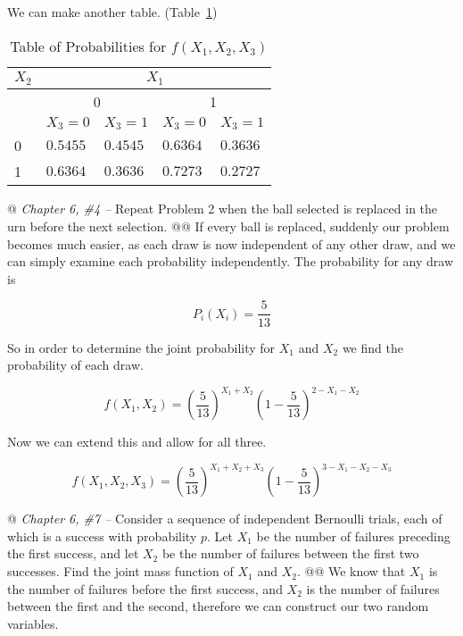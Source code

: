 \documentclass[11pt]{article}\usepackage[]{graphicx}\usepackage[]{xcolor}
\begin{document}
\begin{easylist}[enumerate]
    We can make another table. (Table~\ref{table:probs.b})

    \begin{table}
        \centering
        \begin{tabular}{|l|l|l|l|l|}
            \hline
            $X_2$ & \multicolumn{4}{|c|}{$X_1$}\\
            \hline
            & \multicolumn{2}{|c|}{0} & \multicolumn{2}{|c|}{1}\\
            \hline
            & $X_3 = 0$ & $X_3 = 1$ & $X_3 = 0$ & $X_3 = 1$\\
            \hline
            0 & $0.5455$ & $0.4545$ & $0.6364$ & $0.3636$\\
            1 & $0.6364$ & $0.3636$ & $0.7273$ & $0.2727$\\
            \hline
        \end{tabular}
        \caption{Table of Probabilities for $f(X_1, X_2, X_3)$}
        \label{table:probs.b}
    \end{table}

    @ \textit{Chapter 6, \#4 --} Repeat Problem 2 when the ball selected is replaced in the urn before the next
    selection.
    @@ If every ball is replaced, suddenly our problem becomes much easier, as each draw is now independent of any other
    draw, and we can simply examine each probability independently. The probability for any draw is

    \[
        P_i(X_i) = \frac{5}{13}
    \]

    So in order to determine the joint probability for $X_1$ and $X_2$ we find the probability of each draw.

    \[
        f(X_1, X_2) = { \left( \frac{5}{13} \right) }^{X_1 + X_2} { \left( 1 - \frac{5}{13} \right) }^{2 - X_1 - X_2}
    \]

    Now we can extend this and allow for all three.

    \[
        f(X_1, X_2, X_3) = { \left( \frac{5}{13} \right) }^{X_1 + X_2 + X_3}
                           { \left( 1 - \frac{5}{13} \right) }^{3 - X_1 - X_2 - X_3}
    \]

    @ \textit{Chapter 6, \#7 --} Consider a sequence of independent Bernoulli trials, each of which is a success with
    probability $p$. Let $X_1$ be the number of failures preceding the first success, and let $X_2$ be the number of
    failures between the first two successes. Find the joint mass function of $X_1$ and $X_2$.
    @@ We know that $X_1$ is the number of failures before the first success, and $X_2$ is the number of failures between
    the first and the second, therefore we can construct our two random variables.


\end{easylist}
\end{document}
